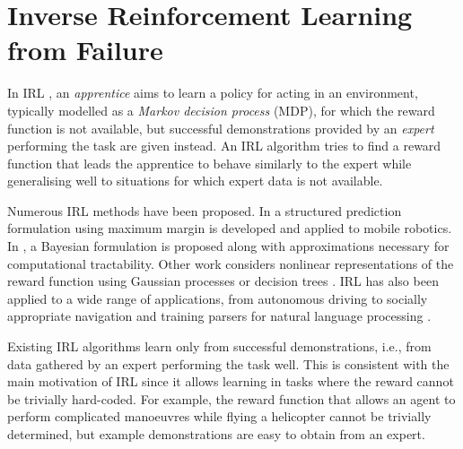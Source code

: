 \documentclass[a4paper,11pt]{report}
\begin{document}
\label{sec:intro}

\section{Inverse Reinforcement Learning from Failure}
\label{sec:irlf}

In IRL \cite{ng2000algorithms}, an \emph{apprentice} aims to learn a policy for acting in an environment, typically modelled as a \emph{Markov decision process} (MDP), for which the reward function is not available, but successful demonstrations provided by an \emph{expert} performing the task are given instead. An IRL algorithm tries to find a reward function that leads the apprentice to behave  similarly to the expert while generalising well to situations for which expert data is not available. 


Numerous IRL methods have been proposed. In \cite{ratliff2006maximum} a structured prediction formulation using maximum margin is developed and applied to mobile robotics. In \cite{ramachandran2007bayesian},  a  Bayesian formulation is proposed along with approximations necessary for computational tractability. Other work considers nonlinear representations of the reward function using Gaussian processes \cite{levine2011nonlinear} or decision trees \cite{ratliff2007boosting}. IRL has also been applied to a wide range of applications, from  autonomous driving \cite{abbeel2004apprenticeship,kuderer2015learning} to socially appropriate navigation \cite{henry2010learning,vasquez2014inverse} and training parsers for natural language processing \cite{neu2009training}.


Existing IRL algorithms learn only from successful demonstrations, i.e., from data gathered by an expert performing the task well. This is consistent with the main motivation of IRL since it allows learning in tasks where the reward cannot be trivially hard-coded.  For example, the reward function that allows an agent to perform complicated manoeuvres while flying a helicopter cannot be trivially determined, but example demonstrations are easy to obtain from an expert.
\end{document}
